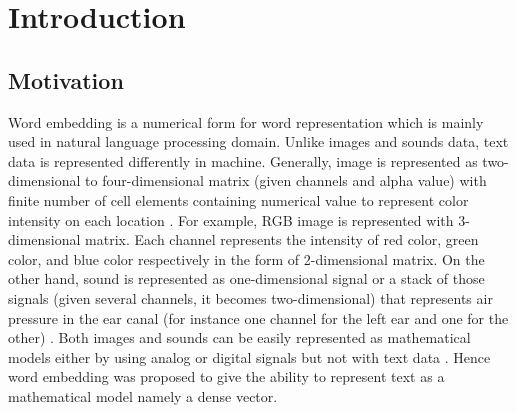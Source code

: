 \chapter{Introduction}
\label{chap:intro}

\section{Motivation} 
    Word embedding is a numerical form for word representation which
    is mainly used in natural language processing domain. Unlike
    images and sounds data, text data is represented differently in
    machine. Generally, image is represented as two-dimensional to
    four-dimensional matrix (given channels and alpha value) with
    finite number of cell elements containing numerical value to
    represent color intensity on each location
    \citep{imageprocessing2018tyagi}. For example, RGB image is
    represented with 3-dimensional matrix. Each channel represents the
    intensity of red color, green color, and blue color respectively
    in the form of 2-dimensional matrix. On the other hand, sound is
    represented as one-dimensional signal or a stack of those signals
    (given several channels, it becomes two-dimensional) that
    represents air pressure in the ear canal (for instance one channel
    for the left ear and one for the other)
    \citep{sound1995rocchesso}. Both images and sounds can be easily
    represented as mathematical models either by using analog or
    digital signals but not with text data
    \citep{wordembedding2017yang}. Hence word embedding was proposed
    to give the ability to represent text as a mathematical model
    namely a dense vector.
    
